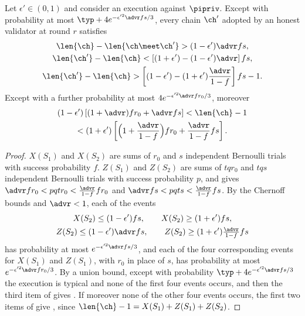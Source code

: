 \begin{theorem}\label{thm.attack}
    Let $\epsilon'\in(0,1)$ and consider an execution against $\pipriv$. Except
    with probability at most $\typ+4e^{-\epsilon'^2\advr fs/3}$, every chain
    $\ch'$ adopted by an honest validator at round $r$ satisfies
    \begin{gather}
        \len{\ch}-\len{\ch\meet\ch'} > (1-\epsilon')\advr fs,
            \label{eq.attfork}\\
        \len{\ch'}-\len{\ch} < \left[(1+\epsilon')-(1-\epsilon')\advr\right]fs,
            \label{eq.attupper}\\
        \len{\ch'}-\len{\ch} > \left[(1-\epsilon')-(1+\epsilon')\frac{\advr}{1-f}\right]fs-1.
            \label{eq.attlower}
    \end{gather}
    Except with a further probability at most $4e^{-\epsilon'^2\advr fr_0/3}$,
    moreover
    \begin{equation}\label{eq.attheight}
        \begin{gathered}
            (1-\epsilon')\left[(1+\advr)fr_0+\advr fs\right] < \len{\ch}-1 \\
            < (1+\epsilon')\left[\Big(1+\frac{\advr}{1-f}\Big)fr_0+\frac{\advr}{1-f}fs\right].
        \end{gathered}
    \end{equation}
\end{theorem}
\begin{proof}
    $X(S_1)$ and $X(S_2)$ are sums of $r_0$ and $s$ independent Bernoulli
    trials with success probability $f$. $Z(S_1)$ and $Z(S_2)$ are sums of
    $tqr_0$ and $tqs$ independent Bernoulli trials with success probability
    $p$, and  gives $\advr fr_0<pqtr_0<\frac{\advr}{1-f}fr_0$
    and $\advr fs<pqts<\frac{\advr}{1-f}fs$. By the Chernoff bounds and
    $\advr<1$, each of the events
    \[
        \begin{gathered}
            X(S_2)\le(1-\epsilon')fs,\qquad X(S_2)\ge(1+\epsilon')fs,\\
            Z(S_2)\le(1-\epsilon')\advr fs,\qquad
            Z(S_2)\ge(1+\epsilon')\tfrac{\advr}{1-f}fs
        \end{gathered}
    \]
    has probability at most $e^{-\epsilon'^2\advr fs/3}$, and each of the four
    corresponding events for $X(S_1)$ and $Z(S_1)$, with $r_0$ in place of
    $s$, has probability at most $e^{-\epsilon'^2\advr fr_0/3}$. By a union
    bound, except with probability $\typ+4e^{-\epsilon'^2\advr fs/3}$ the
    execution is typical and none of the first four events occurs, and then
    the third item of  gives
    . If moreover none of the other
    four events occurs, the first two items of  give
    , since $\len{\ch}-1=X(S_1)+Z(S_1)+Z(S_2)$.
\end{proof}

